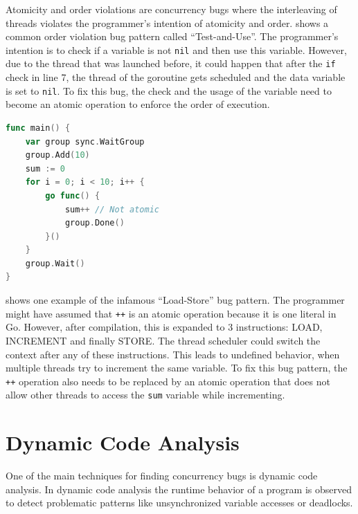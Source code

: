 \documentclass[conference]{IEEEtran}
\begin{document}
Atomicity and order violations are concurrency bugs where the interleaving of threads violates the programmer's intention of atomicity and order.
 shows a common order violation bug pattern called ``Test-and-Use''.
The programmer's intention is to check if a variable is not \lstinline{nil} and then use this variable.
However, due to the thread that was launched before, it could happen that after the \lstinline{if} check in line 7, the thread of the goroutine gets scheduled and the data variable is set to \lstinline{nil}.
To fix this bug, the check and the usage of the variable need to become an atomic operation to enforce the order of execution.

\begin{lstlisting}[float=h, language=Go, label=lst:atomicity, caption=Load-Store bug pattern -- Atomicity violation]
func main() {
    var group sync.WaitGroup
    group.Add(10)
    sum := 0
    for i = 0; i < 10; i++ {
        go func() {
            sum++ // Not atomic
            group.Done()
        }()
    }
    group.Wait()
}
\end{lstlisting}

 shows one example of the infamous ``Load-Store'' bug pattern.
The programmer might have assumed that \lstinline{++} is an atomic operation because it is one literal in Go.
However, after compilation, this is expanded to 3 instructions: LOAD, INCREMENT and finally STORE.
The thread scheduler could switch the context after any of these instructions.
This leads to undefined behavior, when multiple threads try to increment the same variable.
To fix this bug pattern, the \lstinline{++} operation also needs to be replaced by an atomic operation that does not allow other threads to access the \lstinline{sum} variable while incrementing.


\section{Dynamic Code Analysis}
\label{sct:dynamic}

One of the main techniques for finding concurrency bugs is dynamic code analysis.
In dynamic code analysis the runtime behavior of a program is observed to detect problematic patterns like unsynchronized variable accesses or deadlocks.
\end{document}
